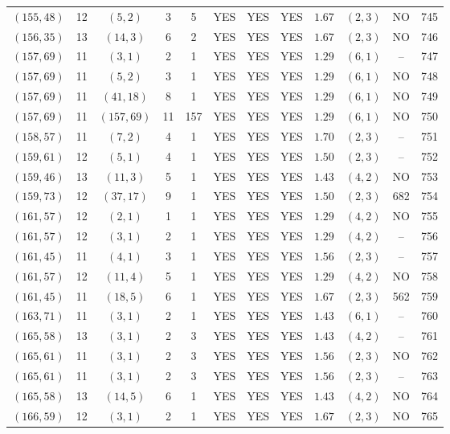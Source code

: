 \begin{longtable}{|c|c|c|c|c|c|c|c|c|c|c|c|}
$(155,48)$ & 12 & $(5,2)$ & 3 & 5 & YES & YES & YES & $1.67$ & $(2,3)$ & NO & 745\\
$(156,35)$ & 13 & $(14,3)$ & 6 & 2 & YES & YES & YES & $1.67$ & $(2,3)$ & NO & 746\\
$(157,69)$ & 11 & $(3,1)$ & 2 & 1 & YES & YES & YES & $1.29$ & $(6,1)$ & -- & 747\\
$(157,69)$ & 11 & $(5,2)$ & 3 & 1 & YES & YES & YES & $1.29$ & $(6,1)$ & NO & 748\\
$(157,69)$ & 11 & $(41,18)$ & 8 & 1 & YES & YES & YES & $1.29$ & $(6,1)$ & NO & 749\\
$(157,69)$ & 11 & $(157,69)$ & 11 & 157 & YES & YES & YES & $1.29$ & $(6,1)$ & NO & 750\\
$(158,57)$ & 11 & $(7,2)$ & 4 & 1 & YES & YES & YES & $1.70$ & $(2,3)$ & -- & 751\\
$(159,61)$ & 12 & $(5,1)$ & 4 & 1 & YES & YES & YES & $1.50$ & $(2,3)$ & -- & 752\\
$(159,46)$ & 13 & $(11,3)$ & 5 & 1 & YES & YES & YES & $1.43$ & $(4,2)$ & NO & 753\\
$(159,73)$ & 12 & $(37,17)$ & 9 & 1 & YES & YES & YES & $1.50$ & $(2,3)$ & 682 & 754\\
$(161,57)$ & 12 & $(2,1)$ & 1 & 1 & YES & YES & YES & $1.29$ & $(4,2)$ & NO & 755\\
$(161,57)$ & 12 & $(3,1)$ & 2 & 1 & YES & YES & YES & $1.29$ & $(4,2)$ & -- & 756\\
$(161,45)$ & 11 & $(4,1)$ & 3 & 1 & YES & YES & YES & $1.56$ & $(2,3)$ & -- & 757\\
$(161,57)$ & 12 & $(11,4)$ & 5 & 1 & YES & YES & YES & $1.29$ & $(4,2)$ & NO & 758\\
$(161,45)$ & 11 & $(18,5)$ & 6 & 1 & YES & YES & YES & $1.67$ & $(2,3)$ & 562 & 759\\
$(163,71)$ & 11 & $(3,1)$ & 2 & 1 & YES & YES & YES & $1.43$ & $(6,1)$ & -- & 760\\
$(165,58)$ & 13 & $(3,1)$ & 2 & 3 & YES & YES & YES & $1.43$ & $(4,2)$ & -- & 761\\
$(165,61)$ & 11 & $(3,1)$ & 2 & 3 & YES & YES & YES & $1.56$ & $(2,3)$ & NO & 762\\
$(165,61)$ & 11 & $(3,1)$ & 2 & 3 & YES & YES & YES & $1.56$ & $(2,3)$ & -- & 763\\
$(165,58)$ & 13 & $(14,5)$ & 6 & 1 & YES & YES & YES & $1.43$ & $(4,2)$ & NO & 764\\
$(166,59)$ & 12 & $(3,1)$ & 2 & 1 & YES & YES & YES & $1.67$ & $(2,3)$ & NO & 765\\

\end{longtable}

